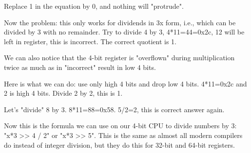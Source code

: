 Replace 1 in the equation by 0, and nothing will "protrude".

Now the problem: this only works for dividends in 3x form, i.e., which can be divided by 3 with no remainder.
Try to divide 4 by 3, 4*11=44=0x2c, 12 will be left in register, this is incorrect.
The correct quotient is 1.

We can also notice that the 4-bit register is "overflown" during multiplication twice as much as in "incorrect" result in low 4 bits.

Here is what we can do: use only high 4 bits and drop low 4 bits.
4*11=0x2c and 2 is high 4 bits.
Divide 2 by 2, this is 1.

Let's "divide" 8 by 3. 8*11=88=0x58. 5/2=2, this is correct answer again.

Now this is the formula we can use on our 4-bit CPU to divide numbers by 3: "x*3 >> 4 / 2" or "x*3 >> 5".
This is the same as almost all modern compilers do instead of integer division, but they do this for 32-bit and 64-bit registers.


